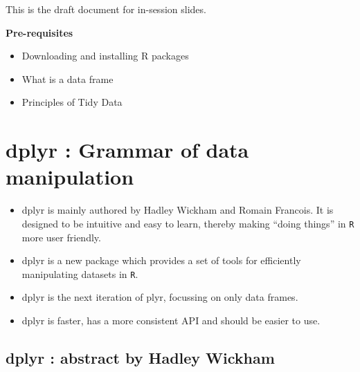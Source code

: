 \documentclass{article}
\begin{document}
	
	\tableofcontents
\begin{framed}
This is the draft document for in-session slides.
\end{framed}
\textbf{Pre-requisites}
\begin{itemize}
\item Downloading and installing R packages
\item What is a data frame
\item Principles of Tidy Data
\end{itemize}
\newpage




\section{dplyr : Grammar of data manipulation}
	\begin{itemize}
		\item dplyr  is mainly authored by Hadley Wickham and Romain Francois. It is designed to be intuitive and easy to learn, thereby making “doing things” in \texttt{R} more user friendly.
		\item dplyr is a new package which provides a set of tools for efficiently manipulating datasets in \texttt{R}.
		\item dplyr is the next iteration of plyr, focussing on only data frames. \item dplyr is faster, has a more consistent API and should be easier to use. 
	\end{itemize}
	
	
\subsection{dplyr : abstract by Hadley Wickham}
\end{document}
